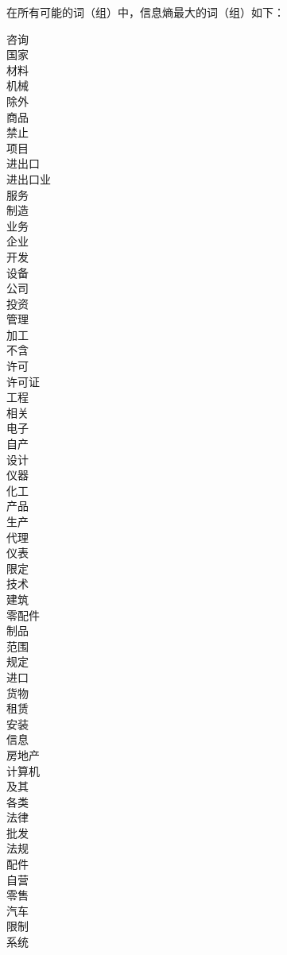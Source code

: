 \documentclass[12pt]{article}
\begin{document}
在所有可能的词（组）中，信息熵最大的词（组）如下：

\begin{multicols}{5}
咨询\\
国家\\
材料\\
机械\\
除外\\
商品\\
禁止\\
项目\\
进出口\\
进出口业\\
服务\\
制造\\
业务\\
企业\\
开发\\
设备\\
公司\\
投资\\
管理\\
加工\\
不含\\
许可\\
许可证\\
工程\\
相关\\
电子\\
自产\\
设计\\
仪器\\
化工\\
产品\\
生产\\
代理\\
仪表\\
限定\\
技术\\
建筑\\
零配件\\
制品\\
范围\\
规定\\
进口\\
货物\\
租赁\\
安装\\
信息\\
房地产\\
计算机\\
及其\\
各类\\
法律\\
批发\\
法规\\
配件\\
自营\\
零售\\
汽车\\
限制\\
系统
\end{multicols}
\end{document}
